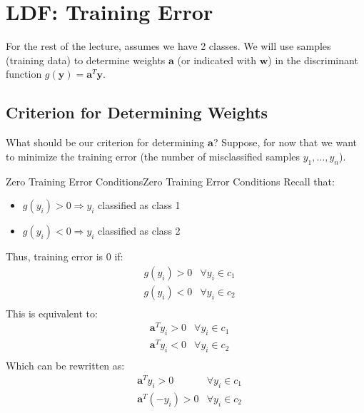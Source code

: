 \documentclass[a4paper]{article}
\theoremstyle{definition}
\begin{document}
\section{LDF: Training Error}
For the rest of the lecture, assumes we have 2 classes.
\vspace{1em}
\noindent
\newline
We will use samples (training data) to determine weights \( \mathbf{a} \) (or indicated with \( \mathbf{w} \)) in the discriminant function \( g(\mathbf{y}) = \mathbf{a}^T \mathbf{y} \).
\subsection{Criterion for Determining Weights}
What should be our criterion for determining \( \mathbf{a} \)?
\vspace{1em}
\noindent 
\newline
Suppose, for now that we want to minimize the training error (the number of misclassified samples $y_1, \ldots, y_n$).
\begin{definition}{Zero Training Error Conditions}{Zero Training Error Conditions}
Recall that:
\begin{itemize}
    \item \( g(y_i) > 0 \Rightarrow y_i \) classified as class 1 
    \item \( g(y_i) < 0 \Rightarrow y_i \) classified as class 2 
\end{itemize}
Thus, training error is 0 if:
\begin{align*}
    &g(y_i) > 0 & \forall y_i \in c_1 \\
    &g(y_i) < 0 & \forall y_i \in c_2 \\
\end{align*}
This is equivalent to:
\begin{align*}
    &\mathbf{a}^T y_i > 0 & \forall y_i \in c_1 \\
    &\mathbf{a}^T y_i < 0 & \forall y_i \in c_2 \\
\end{align*}
Which can be rewritten as:
\begin{align*}
    &\mathbf{a}^T y_i > 0 & \forall y_i \in c_1 \\
    &\mathbf{a}^T (-y_i) > 0 & \forall y_i \in c_2 \\
\end{align*}
\end{definition}
\end{document}
